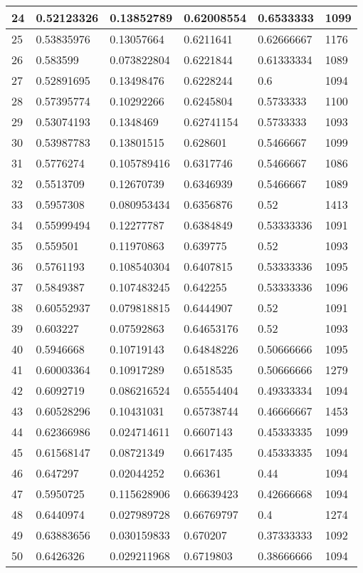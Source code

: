 \begin{longtable}{|l|l|l|l|l|l|}
24 & 0.52123326 & 0.13852789 & 0.62008554 & 0.6533333 & 1099 \\ \hline 
25 & 0.53835976 & 0.13057664 & 0.6211641 & 0.62666667 & 1176 \\ \hline 
26 & 0.583599 & 0.073822804 & 0.6221844 & 0.61333334 & 1089 \\ \hline 
27 & 0.52891695 & 0.13498476 & 0.6228244 & 0.6 & 1094 \\ \hline 
28 & 0.57395774 & 0.10292266 & 0.6245804 & 0.5733333 & 1100 \\ \hline 
29 & 0.53074193 & 0.1348469 & 0.62741154 & 0.5733333 & 1093 \\ \hline 
30 & 0.53987783 & 0.13801515 & 0.628601 & 0.5466667 & 1099 \\ \hline 
31 & 0.5776274 & 0.105789416 & 0.6317746 & 0.5466667 & 1086 \\ \hline 
32 & 0.5513709 & 0.12670739 & 0.6346939 & 0.5466667 & 1089 \\ \hline 
33 & 0.5957308 & 0.080953434 & 0.6356876 & 0.52 & 1413 \\ \hline 
34 & 0.55999494 & 0.12277787 & 0.6384849 & 0.53333336 & 1091 \\ \hline 
35 & 0.559501 & 0.11970863 & 0.639775 & 0.52 & 1093 \\ \hline 
36 & 0.5761193 & 0.108540304 & 0.6407815 & 0.53333336 & 1095 \\ \hline 
37 & 0.5849387 & 0.107483245 & 0.642255 & 0.53333336 & 1096 \\ \hline 
38 & 0.60552937 & 0.079818815 & 0.6444907 & 0.52 & 1091 \\ \hline 
39 & 0.603227 & 0.07592863 & 0.64653176 & 0.52 & 1093 \\ \hline 
40 & 0.5946668 & 0.10719143 & 0.64848226 & 0.50666666 & 1095 \\ \hline 
41 & 0.60003364 & 0.10917289 & 0.6518535 & 0.50666666 & 1279 \\ \hline 
42 & 0.6092719 & 0.086216524 & 0.65554404 & 0.49333334 & 1094 \\ \hline 
43 & 0.60528296 & 0.10431031 & 0.65738744 & 0.46666667 & 1453 \\ \hline 
44 & 0.62366986 & 0.024714611 & 0.6607143 & 0.45333335 & 1099 \\ \hline 
45 & 0.61568147 & 0.08721349 & 0.6617435 & 0.45333335 & 1094 \\ \hline 
46 & 0.647297 & 0.02044252 & 0.66361 & 0.44 & 1094 \\ \hline 
47 & 0.5950725 & 0.115628906 & 0.66639423 & 0.42666668 & 1094 \\ \hline 
48 & 0.6440974 & 0.027989728 & 0.66769797 & 0.4 & 1274 \\ \hline 
49 & 0.63883656 & 0.030159833 & 0.670207 & 0.37333333 & 1092 \\ \hline 
50 & 0.6426326 & 0.029211968 & 0.6719803 & 0.38666666 & 1094 \\ \hline 
\end{longtable}